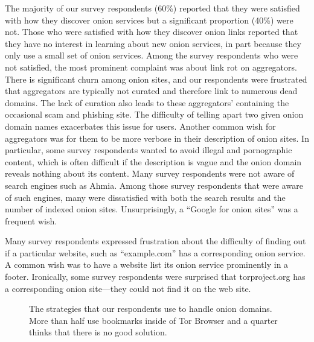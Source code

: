 The majority of our survey respondents (60\%) reported that they were satisfied with how they discover onion services but a significant proportion (40\%) were not. Those who were satisfied with how they discover onion links reported that they have no
interest in learning about new onion services, in part because they only use a
small set of onion services.  Among the survey respondents who were not satisfied, the most
prominent complaint was about link rot on aggregators.  There is significant
churn among onion sites, and our respondents were frustrated that aggregators
are typically not curated and therefore link to numerous dead domains.  The lack
of curation also leads to these aggregators' containing the occasional scam and
phishing site.  The difficulty of telling apart two given onion domain names
exacerbates this issue for users.  Another common wish for aggregators was for
them to be more verbose in their description of onion sites.  In particular,
some survey respondents wanted to avoid illegal and pornographic content, which is often
difficult if the description is vague and the onion domain reveals nothing about
its content.  Many survey respondents were not aware of search engines such as Ahmia.
Among those survey respondents that were aware of such engines, many were dissatisfied with both the search results and
the number of indexed onion sites.  Unsurprisingly, a ``Google for onion sites''
was a frequent wish.

Many survey respondents expressed frustration about the difficulty of finding out if a particular website, such as 
``example.com'' has a corresponding onion service.  A common wish was to have
a website list its onion service prominently in a footer.  Ironically, some
survey respondents were surprised that torproject.org has a corresponding onion
site---they could not find it on the web site.



\begin{figure}[t]
    \centering
    
    \caption{The strategies that our respondents use to handle onion domains.
    More than half use bookmarks inside of Tor Browser and a quarter thinks that
    there is no good solution.}
    \label{fig:onion-domain-mgmt}
\end{figure}

